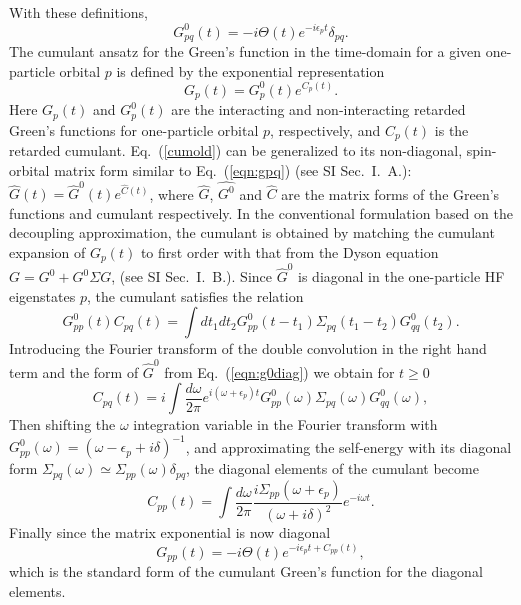 \documentclass[aps,prb,twocolumn,groupaddress,floatfix]{revtex4}
\begin{document}
With these definitions,
\begin{equation}
\label{eqn:g0diag}
G^0_{pq}(t) = -i\Theta(t) e^{-i\epsilon_p t}\delta_{pq}.
\end{equation}
The cumulant ansatz for the Green's function in the time-domain for a given
one-particle orbital $p$ is
defined\cite{PhysRevB.90.085112,PhysRevLett.77.2268} by the exponential representation
\begin{equation}
\label{cumold}
G_{p}(t) = G^0_{p}(t)e^{C_{p}(t)}.
\end{equation}
Here $G_{p}(t)$ and $G^0_{p}(t)$ are the interacting and non-interacting retarded
Green's functions for one-particle orbital $p$, respectively,
and $C_{p}(t)$ is
the retarded cumulant. Eq.\ (\ref{cumold})
can be generalized to its non-diagonal, spin-orbital matrix
form similar to Eq.\ (\ref{eqn:gpq}) (see SI Sec.\ I.\ A.):
$\hat{G}(t) = \hat{G}^0(t)e^{\hat{C}(t)}$,
where $\hat{G}$, $\hat{G^0}$ and $\hat{C}$ are the matrix forms of the Green's
functions and cumulant respectively.
In the conventional formulation based on the decoupling approximation,
the cumulant is obtained
by matching the cumulant expansion of $G_p(t)$ to first order
with that from the Dyson equation $G=G^0+G^0\Sigma G$,
(see SI Sec.\ I.\ B.).\cite{PhysRevB.90.085112,PhysRevLett.77.2268}
Since $\hat{G}^0$ is diagonal in the one-particle HF
eigenstates $p$, the cumulant satisfies the relation
\begin{equation}
G^0_{pp}(t) C_{pq}(t) = \int dt_1 dt_2 G^0_{pp}(t-t_1)
\Sigma_{pq}(t_1-t_2) G^0_{qq}(t_2).
\end{equation}
Introducing the Fourier transform of the double convolution
in the right hand term and the form
of $\hat{G}^0$ from Eq.\ (\ref{eqn:g0diag}) we obtain for $t\geq0$
\begin{equation}
C_{pq}(t) = i \int \frac{d\omega}{2\pi} e^{i(\omega+\epsilon_p) t}
G^0_{pp}(\omega) \Sigma_{pq}(\omega) G^0_{qq}(\omega),
\end{equation}
Then shifting the $\omega$ integration variable in the Fourier transform 
with $G^0_{pp}(\omega)=(\omega-\epsilon_p+i\delta)^{-1}$,
and approximating the self-energy with its diagonal form
$\Sigma_{pq}(\omega) \simeq \Sigma_{pp}(\omega) \delta_{pq}$,
the diagonal elements of the cumulant become
\begin{equation}
\label{eqn:cum_diag_t}
C_{pp}(t) = \int \frac{d\omega}{2\pi} \frac{i\Sigma_{pp}(\omega+\epsilon_p)}
{(\omega+i\delta)^2} e^{-i\omega t}.
\end{equation}
Finally since the matrix exponential is now diagonal 
\begin{equation}
\label{eqn:g_cum_diag}
G_{pp}(t) = -i \Theta(t) e^{-i \epsilon_p t + C_{pp}(t)},
\end{equation}
which is the standard form of the cumulant Green's function for
the diagonal elements.
\end{document}
